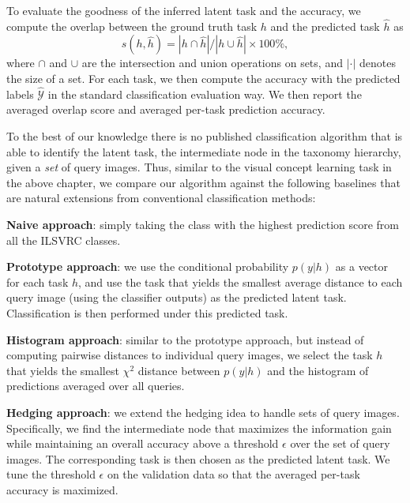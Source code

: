 To evaluate the goodness of the inferred latent task and the accuracy, we compute the overlap between the ground truth task $h$ and the predicted task $\hat{h}$ as
\begin{equation}
    s(h, \hat{h}) = |h\cap \hat{h}| / |h \cup \hat{h}| \times 100 \%,
\end{equation}
where $\cap$ and $\cup$ are the intersection and union operations on sets, and $|\cdot|$ denotes the size of a set. For each task, we then compute the accuracy with the predicted labels $\hat{\mathcal{Y}}$ in the standard classification evaluation way. We then report the averaged overlap score and averaged per-task prediction accuracy.

To the best of our knowledge there is no published classification algorithm that is able to identify the latent task, \ie the intermediate node in the taxonomy hierarchy, given a \emph{set} of query images. Thus, similar to the visual concept learning task in the above chapter, we compare our algorithm against the following baselines that are natural extensions from conventional classification methods:
\begin{list}{}
    \item {\bfseries Naive approach}: simply taking the class with the highest prediction score from all the ILSVRC classes.
    \item {\bfseries Prototype approach}: we use the conditional probability $p(y|h)$ as a vector for each task $h$, and use the task that yields the smallest average distance to each query image (using the classifier outputs) as the predicted latent task. Classification is then performed under this predicted task.
    \item {\bfseries Histogram approach}: similar to the prototype approach, but instead of computing pairwise distances to individual query images, we select the task $h$ that yields the smallest $\chi^2$ distance between $p(y|h)$ and the histogram of predictions averaged over all queries.
    \item {\bfseries Hedging approach}: we extend the hedging idea \cite{deng2012hedging} to handle sets of query images. Specifically, we find the intermediate node that maximizes the information gain while maintaining an overall accuracy above a threshold $\epsilon$ over the set of query images. The corresponding task is then chosen as the predicted latent task. We tune the threshold $\epsilon$ on the validation data so that the averaged per-task accuracy is maximized.
\end{list}
